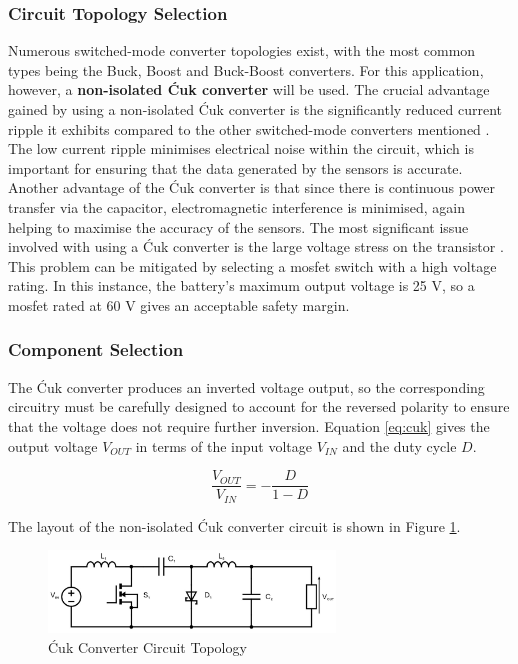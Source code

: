 \subsubsection{Circuit Topology Selection}

Numerous switched-mode converter topologies exist, with the most common types being the Buck, Boost and Buck-Boost converters. For this application, however, a \textbf{non-isolated Ćuk converter} will be used. The crucial advantage gained by using a non-isolated Ćuk converter is the significantly reduced current ripple it exhibits compared to the other switched-mode converters mentioned \cite{cuk1981dc-to-dc}. The low current ripple minimises electrical noise within the circuit, which is important for ensuring that the data generated by the sensors is accurate. Another advantage of the Ćuk converter is that since there is continuous power transfer via the capacitor, electromagnetic interference is minimised, again helping to maximise the accuracy of the sensors. The most significant issue involved with using a Ćuk converter is the large voltage stress on the transistor \cite{Bailey:1641409}. This problem can be mitigated by selecting a \gls{mosfet} switch with a high voltage rating. In this instance, the battery's maximum output voltage is 25 V, so a \gls{mosfet} rated at 60 V gives an acceptable safety margin.

\subsubsection{Component Selection}

The Ćuk converter produces an inverted voltage output, so the corresponding circuitry must be carefully designed to account for the reversed polarity to ensure that the voltage does not require further inversion. Equation \ref{eq:cuk} gives the output voltage $V_{OUT}$ in terms of the input voltage $V_{IN}$ and the duty cycle $D$.

\begin{equation}
  \frac{V_{OUT}}{V_{IN}} = - \frac{D}{1-D}
  \label{eq:cuk}
\end{equation}

The layout of the non-isolated Ćuk converter circuit is shown in Figure \ref{fig:cukdiagram}.

\begin{figure}[H]
  \centering
  \includegraphics[width=0.68\textwidth]{figs/Samuel/Figures/mosfet cuk (1).pdf}
  \caption{Ćuk Converter Circuit Topology}
  \label{fig:cukdiagram}
\end{figure}



